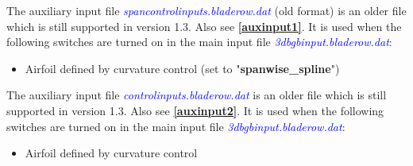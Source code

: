 \documentclass[8pt]{article}
\begin{document}
\noindent
The auxiliary input file \textit{\textcolor{blue}{spancontrolinputs.bladerow.dat}} (old format) is an older file which is still supported in version 1.3. Also see \textbf{\ref{auxinput1}}. It is used when the following switches are turned on in the main input file \textit{\textcolor{blue}{3dbgbinput.bladerow.dat}}:
\begin{itemize}
    \item Airfoil defined by curvature control (set to "\textbf{spanwise\_spline}")
\end{itemize}

\noindent 
The auxiliary input file \textit{\textcolor{blue}{controlinputs.bladerow.dat}} is an older file which is still supported in version 1.3. Also see \textbf{\ref{auxinput2}}. It is used when the following switches are turned on in the main input file \textit{\textcolor{blue}{3dbgbinput.bladerow.dat}}:
\begin{itemize}
    \item Airfoil defined by curvature control 
\end{itemize}
\end{document}

